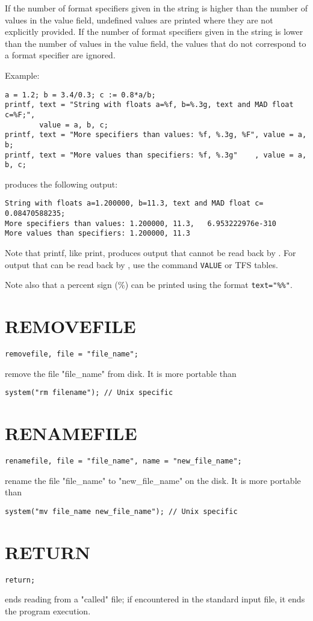 If the number of format specifiers given in the string is higher 
than the number of values in the value field, undefined values are printed 
where they are not explicitly provided. 
If the number of format specifiers given in the string is lower 
than the number of values in the value field, the values that 
do not correspond to a format specifier are ignored. 


Example:
\begin{verbatim}
a = 1.2; b = 3.4/0.3; c := 0.8*a/b;
printf, text = "String with floats a=%f, b=%.3g, text and MAD float c=%F;", 
        value = a, b, c;
printf, text = "More specifiers than values: %f, %.3g, %F", value = a, b;
printf, text = "More values than specifiers: %f, %.3g"    , value = a, b, c;
\end{verbatim}
produces the following output:
\begin{verbatim}
String with floats a=1.200000, b=11.3, text and MAD float c=     0.08470588235;
More specifiers than values: 1.200000, 11.3,   6.953222976e-310
More values than specifiers: 1.200000, 11.3
\end{verbatim}

Note that printf, like print, produces output that cannot be read back
by \madx. For output that can be read back by \madx, use the command
{\tt VALUE} or TFS tables.

Note also that a percent sign (\%) can be printed using the format
\verb|text="%%"|. 


\section{REMOVEFILE}
\label{sec:removefile}
\begin{verbatim}
removefile, file = "file_name";
\end{verbatim} 
remove the file "file\_name" from disk. It is more portable than  
\begin{verbatim}
system("rm filename"); // Unix specific
\end{verbatim}

\section{RENAMEFILE}
\label{sec:renamefile}
\begin{verbatim}
renamefile, file = "file_name", name = "new_file_name";
\end{verbatim} 
rename the file "file\_name" to "new\_file\_name" on the disk. It is more
portable than  
\begin{verbatim}
system("mv file_name new_file_name"); // Unix specific
\end{verbatim}


\section{RETURN}
\label{Sec:return}
\begin{verbatim}
return;
\end{verbatim} 
ends reading from a "called" file; if encountered in the standard input
file, it ends the program execution.  

